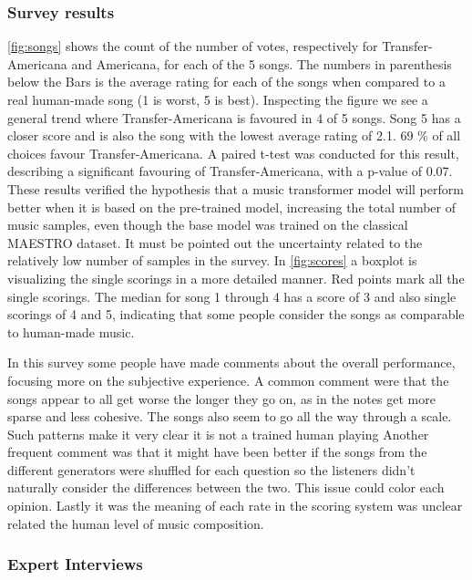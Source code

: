 \documentclass{IEEEtran}
\begin{document}
\subsubsection{Survey results}

\autoref{fig:songs} shows the count of the number of votes, respectively
for Transfer-Americana and Americana, for each of the 5 songs. The numbers in
parenthesis below the Bars is the average rating for each of the songs when
compared to a real human-made song (1 is worst, 5 is best). Inspecting the
figure we see a general trend where Transfer-Americana is favoured in 4 of 5
songs. Song 5 has a closer score and is also the song with the lowest average
rating of 2.1. 69 \% of all choices favour Transfer-Americana. A paired
t-test was conducted for this result, describing a significant favouring of
Transfer-Americana, with a p-value of 0.07. These results verified the
hypothesis that a music transformer model will perform better when it is
based on the pre-trained model, increasing the total number of music samples,
even though the base model was trained on the classical MAESTRO
dataset. It must be pointed out the uncertainty related to the relatively low
number of samples in the survey. In \autoref{fig:scores} a boxplot is
visualizing the single scorings in a more detailed manner. Red points mark
all the single scorings. The median for song 1 through 4 has a score of 3 and also
single scorings of 4 and 5, indicating that some people consider the songs as
comparable to human-made music.

In this survey some people have made comments about the overall performance,
focusing more on the subjective experience. A common comment were that the songs appear to all
get worse the longer they go on, as in the notes get more sparse and less
cohesive. The songs also seem to go all the way through a
scale. Such patterns make it very clear it is not a trained human playing
Another frequent comment was that it might have been better if the
songs from the different generators were shuffled for each question so the listeners
didn't naturally consider the differences between the two. This issue could 
color each opinion. Lastly it was the meaning of each 
rate in the scoring system was unclear related the human level of music composition.

\subsubsection{Expert Interviews}
\end{document}
